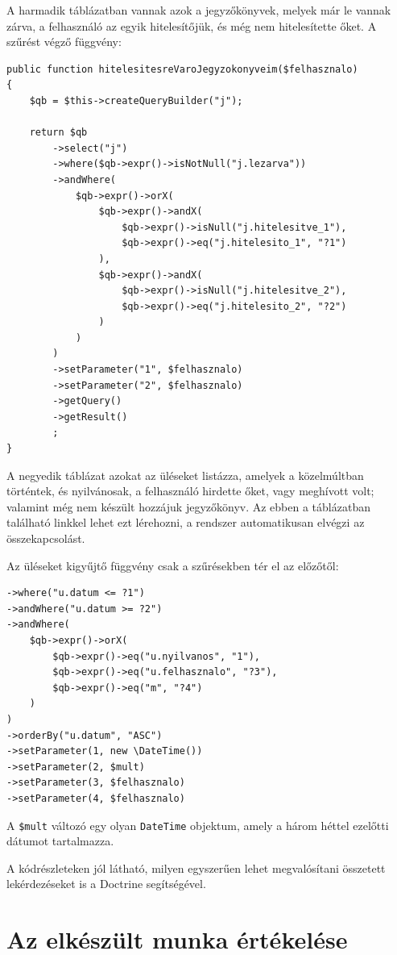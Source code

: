 \documentclass[a4paper,12pt,oneside]{report}
\begin{document}
A harmadik táblázatban vannak azok a jegyzőkönyvek, melyek már le vannak zárva, a felhasználó az egyik hitelesítőjük, és még nem hitelesítette őket. A szűrést végző függvény:

\begin{lstlisting}
public function hitelesitesreVaroJegyzokonyveim($felhasznalo)
{
    $qb = $this->createQueryBuilder("j");

    return $qb
        ->select("j")
        ->where($qb->expr()->isNotNull("j.lezarva"))
        ->andWhere(
            $qb->expr()->orX(
                $qb->expr()->andX(
                    $qb->expr()->isNull("j.hitelesitve_1"),
                    $qb->expr()->eq("j.hitelesito_1", "?1")
                ),
                $qb->expr()->andX(
                    $qb->expr()->isNull("j.hitelesitve_2"),
                    $qb->expr()->eq("j.hitelesito_2", "?2")
                )
            )
        )
        ->setParameter("1", $felhasznalo)
        ->setParameter("2", $felhasznalo)
        ->getQuery()
        ->getResult()
        ;
}
\end{lstlisting}

A negyedik táblázat azokat az üléseket listázza, amelyek a közelmúltban történtek, és nyilvánosak, a felhasználó hirdette őket, vagy meghívott volt; valamint még nem készült hozzájuk jegyzőkönyv. Az ebben a táblázatban található linkkel lehet ezt lérehozni, a rendszer automatikusan elvégzi az összekapcsolást.

Az üléseket kigyűjtő függvény csak a szűrésekben tér el az előzőtől:

\begin{lstlisting}
->where("u.datum <= ?1")
->andWhere("u.datum >= ?2")
->andWhere(
    $qb->expr()->orX(
        $qb->expr()->eq("u.nyilvanos", "1"),
        $qb->expr()->eq("u.felhasznalo", "?3"),
        $qb->expr()->eq("m", "?4")
    )
)
->orderBy("u.datum", "ASC")
->setParameter(1, new \DateTime())
->setParameter(2, $mult)
->setParameter(3, $felhasznalo)
->setParameter(4, $felhasznalo)
\end{lstlisting}

A {\tt \$mult} változó egy olyan {\tt DateTime} objektum, amely a három héttel ezelőtti dátumot tartalmazza.

A kódrészleteken jól látható, milyen egyszerűen lehet megvalósítani összetett lekérdezéseket is a Doctrine segítségével.

\section{Az elkészült munka értékelése}
\end{document}
